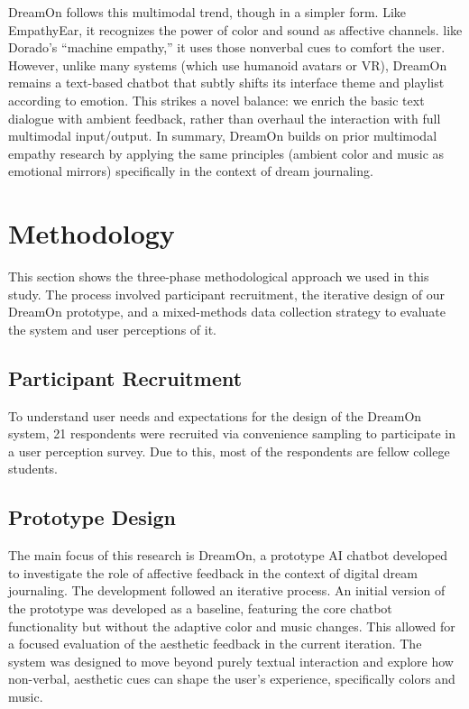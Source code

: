 \documentclass[conference]{IEEEtran}
\begin{document}
    DreamOn follows this multimodal trend, though in a simpler form. Like EmpathyEar, it recognizes the power of color and sound as affective channels. like Dorado’s “machine empathy,” it uses those nonverbal cues to comfort the user. However, unlike many systems (which use humanoid avatars or VR), DreamOn remains a text-based chatbot that subtly shifts its interface theme and playlist according to emotion. This strikes a novel balance: we enrich the basic text dialogue with ambient feedback, rather than overhaul the interaction with full multimodal input/output. In summary, DreamOn builds on prior multimodal empathy research by applying the same principles (ambient color and music as emotional mirrors) specifically in the context of dream journaling.

	\section{Methodology}
	This section shows the three-phase methodological approach we used in this study. The process involved participant recruitment, the iterative design of our DreamOn prototype, and a mixed-methods data collection strategy to evaluate the system and user perceptions of it.
	
	\subsection{Participant Recruitment}
	To understand user needs and expectations for the design of the DreamOn system, 21 respondents were recruited via convenience sampling to participate in a user perception survey. Due to this, most of the respondents are fellow college students.
	
	\subsection{Prototype Design}
	The main focus of this research is DreamOn, a prototype AI chatbot developed to investigate the role of affective feedback in the context of digital dream journaling. The development followed an iterative process. An initial version of the prototype was developed as a baseline, featuring the core chatbot functionality but without the adaptive color and music changes. This allowed for a focused evaluation of the aesthetic feedback in the current iteration. The system was designed to move beyond purely textual interaction and explore how non-verbal, aesthetic cues can shape the user's experience, specifically colors and music.
	
\end{document}
